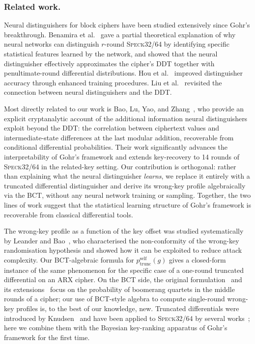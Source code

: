 \documentclass[runningheads]{llncs}
\newcommand{\pself}{p^{\mathrm{self}}_{\mathrm{trunc}}}
\newcommand{\speck}{\textsc{Speck}32/64}
\begin{document}
\subsubsection{Related work.}
Neural distinguishers for block ciphers have been studied extensively
since Gohr's breakthrough.  Benamira et al.~\cite{BGMR23} gave a
partial theoretical explanation of why neural networks can distinguish
$r$-round \speck{} by identifying specific statistical features learned
by the network, and showed that the neural distinguisher effectively
approximates the cipher's DDT together with penultimate-round
differential distributions.  Hou et al.~\cite{HWW23} improved
distinguisher accuracy through enhanced training procedures.  Liu et
al.~\cite{LLLW22} revisited the connection between neural distinguishers
and the DDT.

Most directly related to our work is Bao, Lu, Yao, and
Zhang~\cite{BLY23}, who provide an explicit cryptanalytic account of
the additional information neural distinguishers exploit beyond the DDT:
the correlation between ciphertext values and intermediate-state
differences at the last modular addition, recoverable from conditional
differential probabilities.  Their work significantly advances the
interpretability of Gohr's framework and extends key-recovery to 14
rounds of \speck{} in the related-key setting.  Our contribution is
orthogonal: rather than explaining what the neural distinguisher
\emph{learns}, we replace it entirely with a truncated differential
distinguisher and derive its wrong-key profile algebraically via the
BCT, without any neural network training or sampling.  Together, the
two lines of work suggest that the statistical learning structure of
Gohr's framework is recoverable from classical differential tools.

The wrong-key profile as a function of the key offset was studied
systematically by Leander and Bao~\cite{LeaBao24}, who characterised
the non-conformity of the wrong-key randomisation hypothesis and showed
how it can be exploited to reduce attack complexity.  Our BCT-algebraic
formula for $\pself(g)$ gives a closed-form instance of the same
phenomenon for the specific case of a one-round truncated differential
on an ARX cipher.  On the BCT side, the original
formulation~\cite{CHPSS18} and its extensions~\cite{SBBB19,WQSN19}
focus on the probability of boomerang quartets in the middle rounds of
a cipher; our use of BCT-style algebra to compute single-round
wrong-key profiles is, to the best of our knowledge, new.  Truncated
differentials were introduced by Knudsen~\cite{Knu94} and have been
applied to \speck{} by several works~\cite{ALLW14,KLT15}; here we
combine them with the Bayesian key-ranking apparatus of Gohr's
framework for the first time.
\end{document}
